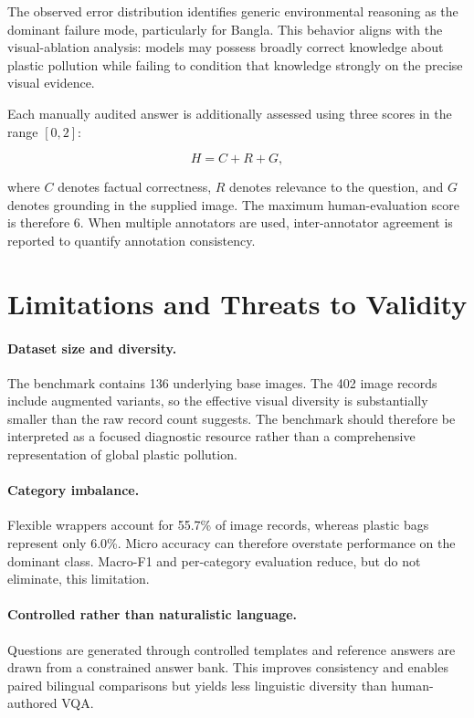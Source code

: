 \documentclass{article}
\begin{document}
The observed error distribution identifies generic environmental reasoning as the dominant failure mode, particularly for Bangla. This behavior aligns with the visual-ablation analysis: models may possess broadly correct knowledge about plastic pollution while failing to condition that knowledge strongly on the precise visual evidence.

Each manually audited answer is additionally assessed using three scores in the range $[0,2]$:

\begin{equation}
H = C + R + G,
\label{eq:human_score}
\end{equation}

where $C$ denotes factual correctness, $R$ denotes relevance to the question, and $G$ denotes grounding in the supplied image. The maximum human-evaluation score is therefore 6. When multiple annotators are used, inter-annotator agreement is reported to quantify annotation consistency.

\section{Limitations and Threats to Validity}
\label{sec:limitations}
% 

\paragraph{Dataset size and diversity.}
The benchmark contains 136 underlying base images. The 402 image records include augmented variants, so the effective visual diversity is substantially smaller than the raw record count suggests. The benchmark should therefore be interpreted as a focused diagnostic resource rather than a comprehensive representation of global plastic pollution.

\paragraph{Category imbalance.}
Flexible wrappers account for 55.7\% of image records, whereas plastic bags represent only 6.0\%. Micro accuracy can therefore overstate performance on the dominant class. Macro-F1 and per-category evaluation reduce, but do not eliminate, this limitation.

\paragraph{Controlled rather than naturalistic language.}
Questions are generated through controlled templates and reference answers are drawn from a constrained answer bank. This improves consistency and enables paired bilingual comparisons but yields less linguistic diversity than human-authored VQA.
\end{document}
